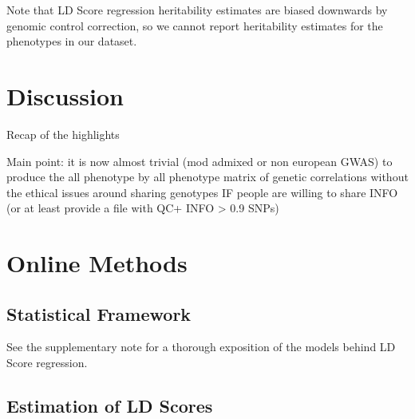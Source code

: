 \documentclass[11pt]{article}
\numberwithin{equation}{section}
\begin{document}
Note that LD Score regression heritability estimates are biased downwards by genomic control correction,
so we cannot report heritability estimates for the phenotypes in our dataset. 

\section{Discussion}\label{Discussion}

Recap of the highlights

Main point: it is now almost trivial (mod admixed or non european GWAS)
to produce the all phenotype by all phenotype matrix of genetic correlations without 
the ethical issues around sharing genotypes IF people are willing to share INFO
(or at least provide a file with QC+ INFO > 0.9 SNPs)

\newpage
\section{Online Methods}\label{Online Methods}

\subsection{Statistical Framework}

See the supplementary note for a thorough exposition of the models behind LD Score regression.

\subsection{Estimation of LD Scores}
\end{document}
